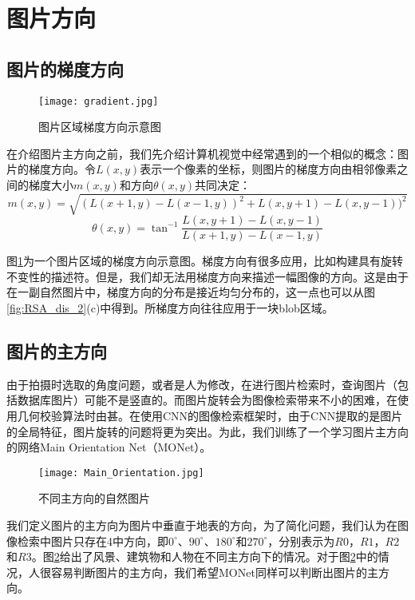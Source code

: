 \section{图片方向}

\subsection{图片的梯度方向}
\begin{figure}
	\centering
	\texttt{[image: gradient.jpg]}
	\caption{图片区域梯度方向示意图}\label{fig:gradient}
\end{figure}
在介绍图片主方向之前，我们先介绍计算机视觉中经常遇到的一个相似的概念：图片的梯度方向。令$L(x,y)$表示一个像素的坐标，则图片的梯度方向由相邻像素之间的梯度大小$m(x,y)$和方向$\theta(x,y)$共同决定：
\begin{equation}
m(x,y) = \sqrt{(L(x+1,y)-L(x-1,y))^2 + L(x,y+1)-L(x,y-1))^2}
\end{equation}
\begin{equation}
\theta(x,y)=\tan^{-1}\frac{L(x,y+1) - L(x,y-1)}{L(x+1,y) - L(x-1,y)}
\end{equation}

图\ref{fig:gradient}为一个图片区域的梯度方向示意图。梯度方向有很多应用，比如构建具有旋转不变性的描述符\cite{lowe2004distinctive}。但是，我们却无法用梯度方向来描述一幅图像的方向。这是由于在一副自然图片中，梯度方向的分布是接近均匀分布的，这一点也可以从图\ref{fig:RSA_dis_2}(c)中得到。所梯度方向往往应用于一块blob区域。

\subsection{图片的主方向}
由于拍摄时选取的角度问题，或者是人为修改，在进行图片检索时，查询图片（包括数据库图片）可能不是竖直的。而图片旋转会为图像检索带来不小的困难，在使用几何校验算法时由甚\cite{jegou2008hamming}\cite{lazebnik2006beyond}。在使用CNN的图像检索框架时，由于CNN提取的是图片的全局特征，图片旋转的问题将更为突出。为此，我们训练了一个学习图片主方向的网络Main Orientation Net（MONet）。

\begin{figure}
	\centering
	\texttt{[image: Main\_Orientation.jpg]}
	\caption{不同主方向的自然图片}\label{fig:main_ori}
\end{figure}

我们定义图片的主方向为图片中垂直于地表的方向，为了简化问题，我们认为在图像检索中图片只存在4中方向，即$0^{\circ}$、$90^{\circ}$、$180^{\circ}$和$270^{\circ}$，分别表示为$R0$，$R1$，$R2$和$R3$。图\ref{fig:main_ori}给出了风景、建筑物和人物在不同主方向下的情况。对于图\ref{fig:main_ori}中的情况，人很容易判断图片的主方向，我们希望MONet同样可以判断出图片的主方向。

